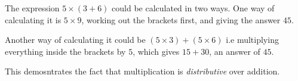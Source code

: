 The expression $5 \times (3+6)$ could be calculated in two ways.
One way of calculating it is $5 \times 9$,  working out the brackets first,
and giving the answer $45$.
\par
Another way of calculating it could be $(5 \times 3)+(5 \times 6)$      
i.e multiplying everything inside the brackets by $5$,
which gives  $15+30$, an answer of  $45$.
\par
This demosntrates the fact that multiplication is 
\emph{distributive} over addition.